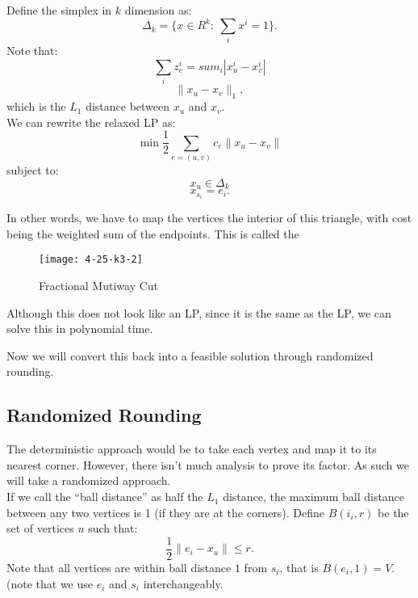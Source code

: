 \documentclass[../main/main.tex]{subfiles}
\begin{document}
Define the simplex in $k$ dimension as: \[
\Delta_k= \{x\in R^{k}:\ \sum_i x^i=1\} 
.\] Note that: \[
\sum_i z^i_e = sum_i |x_u^i-x_v^i|
\] \[
\|x_u-x_v\|_1
,\] which is the $L_1$ distance between $x_u$ and $x_v$.\\

We can rewrite the relaxed LP as:
\[
	\min \frac{1}{2}\sum_{e=(u,v)} c_e \|x_u-x_v\|
\] subject to: \[
x_u\in \Delta_k
\] \[
x_{s_i}=e_i .\] 

In other words, we have to map the vertices the interior of this triangle, with cost being the weighted sum of the endpoints. This is called the  
\begin{figure}[h!]
	\centering
	\texttt{[image: 4-25-k3-2]}
	\caption{Fractional Mutiway Cut}
	\label{fig:4-25-k3-2}
\end{figure}

\begin{remark}
	Although this does not look like an LP, since it is the same as the LP, we can solve this in polynomial time.
\end{remark}

Now we will convert this back into a feasible solution through randomized rounding.

\subsection{Randomized Rounding}
The deterministic approach would be to take each vertex and map it to its nearest corner. However, there isn't much analysis to prove its factor. As such we will take a randomized approach.\\

If we call the ``ball distance'' as half the $L_1$ distance, the maximum ball distance between any two vertices is 1 (if they are at the corners).  Define $B(i_i,r)$ be the set of vertices $u$ such that: \[
		\frac{1}{2}\|e_i -x_u\|\le r
	.\] Note that all vertices are within ball distance $1$ from $s_i$, that is $B(e_i,1)=V$. (note that we use  $e_i$ and $s_i$ interchangeably.
\\
\end{document}

